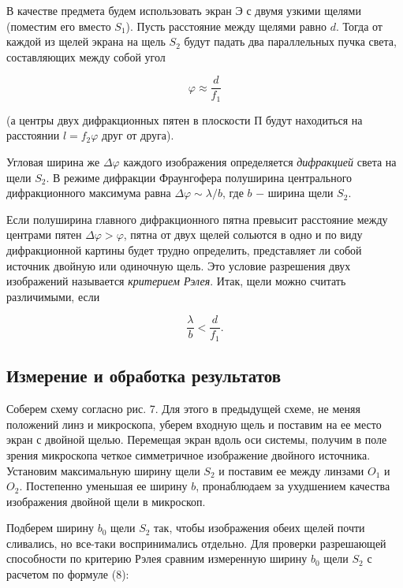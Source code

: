 \documentclass[a4paper,12pt]{article} %
\begin{document}
\hfill \break В качестве предмета будем использовать экран Э с двумя узкими щелями (поместим его вместо $S_1$). Пусть расстояние между щелями равно $d$. Тогда от каждой из щелей экрана на щель $S_2$ будут падать два параллельных пучка света, составляющих между собой угол 

\begin{equation}\label{ linkname }
\varphi \approx \frac {d} {f_1}
\end{equation}

\hfill \break (а центры двух дифракционных пятен в плоскости П будут находиться на расстоянии $l = f_2 \varphi$ друг от друга).

\hfill \break Угловая ширина же $\Delta \varphi$ каждого изображения определяется \textit{дифракцией} света на щели $S_{2}$. В режиме дифракции Фраунгофера полуширина центрального дифракционного максимума равна $\Delta \varphi \sim \lambda / b$, где $b$ $-$ ширина щели $S_2$.

\hfill \break Если полуширина главного дифракционного пятна превысит расстояние между центрами пятен $\Delta \varphi > \varphi$, пятна от двух щелей сольются в одно и по виду дифракционной картины будет трудно определить, представляет ли собой источник двойную или одиночную щель. Это условие разрешения двух изображений называется \textit{критерием Рэлея}. Итак, щели можно считать различимыми, если 

\begin{equation}\label{ linkname }
\frac {\lambda} {b} < \frac {d} {f_1}.
\end{equation}

\subsection{Измерение и обработка результатов}
\hfill \break Соберем схему согласно рис. 7. Для этого в предыдущей схеме, не меняя положений линз и микроскопа, уберем входную щель и поставим на ее место экран с двойной щелью. Перемещая экран вдоль оси системы, получим в поле зрения микроскопа четкое симметричное изображение двойного источника. Установим максимальную ширину щели $S_2$ и поставим ее между линзами $O_1$ и $O_2$. Постепенно уменьшая ее ширину $b$, пронаблюдаем за ухудшением качества изображения двойной щели в микроскоп. 

\hfill \break Подберем ширину $b_0$ щели $S_2$ так, чтобы изображения обеих щелей почти сливались, но все-таки воспринимались отдельно. Для проверки разрешающей способности по критерию Рэлея сравним измеренную ширину $b_0$ щели $S_2$ с расчетом по формуле (8):
\end{document}
